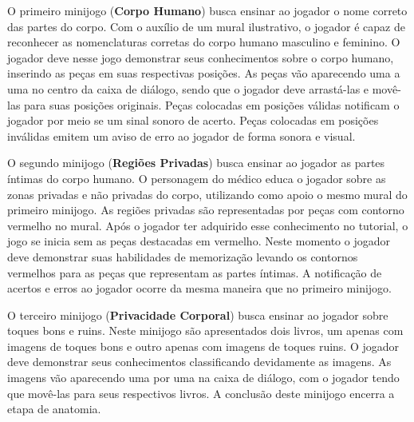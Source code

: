 \begin{figure}
  \vspace{-1.0cm}
\end{figure}

O primeiro minijogo (\textbf{Corpo Humano}) busca ensinar ao jogador o nome correto das partes do corpo. Com o auxílio de um mural ilustrativo, o jogador é capaz de reconhecer as nomenclaturas corretas do corpo humano masculino e feminino. %
O jogador deve nesse jogo demonstrar seus conhecimentos sobre o corpo humano, inserindo as peças em suas respectivas posições. As peças vão aparecendo uma a uma no centro da caixa de diálogo, sendo que o jogador deve arrastá-las e movê-las para suas posições originais. Peças colocadas em posições válidas notificam o jogador por meio se um sinal sonoro de acerto. Peças colocadas em posições inválidas emitem um aviso de erro ao jogador de forma sonora e visual. 

O segundo minijogo (\textbf{Regiões Privadas}) busca ensinar ao jogador as partes íntimas do corpo humano. O personagem do médico educa o jogador sobre as zonas privadas e não privadas do corpo, utilizando como apoio o mesmo mural do primeiro minijogo. As regiões privadas são representadas por peças com contorno vermelho no mural. Após o jogador ter adquirido esse conhecimento no tutorial, o jogo se inicia sem as peças destacadas em vermelho. Neste momento o jogador deve demonstrar suas habilidades de memorização levando os contornos vermelhos para as peças que representam as partes íntimas. A notificação de acertos e erros ao jogador ocorre da mesma maneira que no primeiro minijogo. %

O terceiro minijogo (\textbf{Privacidade Corporal}) busca ensinar ao jogador sobre toques bons e ruins. Neste minijogo são apresentados dois livros, um apenas com imagens de toques bons e outro apenas com imagens de toques ruins. %
O jogador deve demonstrar seus conhecimentos classificando devidamente as imagens. As imagens vão aparecendo uma por uma na caixa de diálogo, com o jogador tendo que movê-las para seus respectivos livros. A conclusão deste minijogo encerra a etapa de anatomia. %


